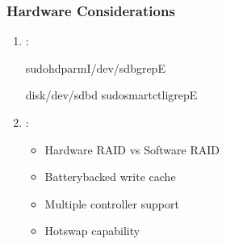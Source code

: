 \documentclass[letterpaper,10pt,english]{sphinxmanual}
\begin{document}
\subsubsection{Hardware Considerations}
\label{\detokenize{raid-systems:hardware-considerations}}\begin{enumerate}
%
\item {} 
\sphinxAtStartPar
{}:

\begin{sphinxVerbatim}[commandchars=\\\{\}]
sudohdparm\PYGZhy{}I/dev/sdbgrep\PYGZhy{}E

disk/dev/sd\PYG{o}{[}b\PYGZhy{}d\PYG{o}{]}
sudosmartctl\PYGZhy{}igrep\PYGZhy{}E
\end{sphinxVerbatim}

\item {} 
\sphinxAtStartPar
{}:
\begin{itemize}
\item {} 
\sphinxAtStartPar
Hardware RAID vs Software RAID

\item {} 
\sphinxAtStartPar
Battery\sphinxhyphen{}backed write cache

\item {} 
\sphinxAtStartPar
Multiple controller support

\item {} 
\sphinxAtStartPar
Hot\sphinxhyphen{}swap capability

\end{itemize}

\end{enumerate}
\end{document}
